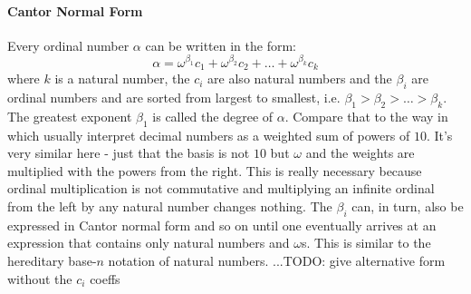 







\paragraph{Cantor Normal Form}
Every ordinal number $\alpha$ can be written in the form:
\begin{equation}
\alpha = \omega^{\beta_1} c_1 + \omega^{\beta_2} c_2 + \ldots + \omega^{\beta_k} c_k
\end{equation}
where $k$ is a natural number, the $c_i$ are also natural numbers and the $\beta_i$ are ordinal numbers and are sorted from largest to smallest, i.e. $\beta_1 > \beta_2 > \ldots > \beta_k$. The greatest exponent $\beta_1$ is called the degree of $\alpha$. Compare that to the way in which usually interpret decimal numbers as a weighted sum of powers of $10$. It's very similar here - just that the basis is not $10$ but $\omega$ and the weights are multiplied with the powers from the right. This is really necessary because ordinal multiplication is not commutative and multiplying an infinite ordinal from the left by any natural number changes nothing. The $\beta_i$ can, in turn, also be expressed in Cantor normal form and so on until one eventually arrives at an expression that contains only natural numbers and $\omega$s. This is similar to the hereditary base-$n$ notation of natural numbers. ...TODO: give alternative form without the $c_i$ coeffs

